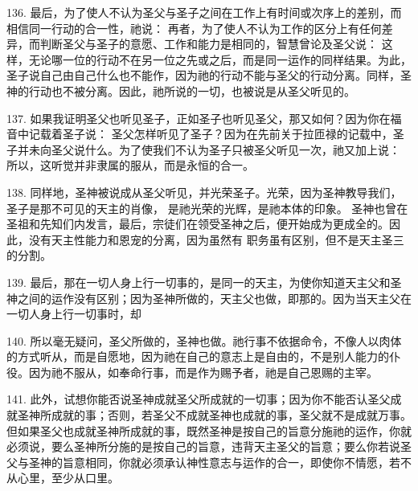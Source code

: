 136. 最后，为了使人不认为圣父与圣子之间在工作上有时间或次序上的差别，而相信同一行动的合一性，祂说： 再者，为了使人不认为工作的区分上有任何差异，而判断圣父与圣子的意愿、工作和能力是相同的，智慧曾论及圣父说： 这样，无论哪一位的行动不在另一位之先或之后，而是同一运作的同样结果。为此，圣子说自己由自己什么也不能作，因为祂的行动不能与圣父的行动分离。同样，圣神的行动也不被分离。因此，祂所说的一切，也被说是从圣父听见的。\par

137. 如果我证明圣父也听见圣子，正如圣子也听见圣父，那又如何？因为你在福音中记载着圣子说： 圣父怎样听见了圣子？因为在先前关于拉匝禄的记载中，圣子并未向圣父说什么。为了使我们不认为圣子只被圣父听见一次，祂又加上说： 所以，这听觉并非隶属的服从，而是永恒的合一。\par

138. 同样地，圣神被说成从圣父听见，并光荣圣子。光荣，因为圣神教导我们，圣子是那不可见的天主的肖像， 是祂光荣的光辉，是祂本体的印象。 圣神也曾在圣祖和先知们内发言，最后，宗徒们在领受圣神之后，便开始成为更成全的。因此，没有天主性能力和恩宠的分离，因为虽然有 职务虽有区别，但不是天主圣三的分割。\par

139. 最后，那在一切人身上行一切事的，是同一的天主，为使你知道天主父和圣神之间的运作没有区别；因为圣神所做的，天主父也做，即那的。因为当天主父在一切人身上行一切事时，却\par

140. 所以毫无疑问，圣父所做的，圣神也做。祂行事不依据命令，不像人以肉体的方式听从，而是自愿地，因为祂在自己的意志上是自由的，不是别人能力的仆役。因为祂不服从，如奉命行事，而是作为赐予者，祂是自己恩赐的主宰。\par

141. 此外，试想你能否说圣神成就圣父所成就的一切事；因为你不能否认圣父成就圣神所成就的事；否则，若圣父不成就圣神也成就的事，圣父就不是成就万事。但如果圣父也成就圣神所成就的事，既然圣神是按自己的旨意分施祂的运作，你就必须说，要么圣神所分施的是按自己的旨意，违背天主圣父的旨意；要么你若说圣父与圣神的旨意相同，你就必须承认神性意志与运作的合一，即使你不情愿，若不从心里，至少从口里。\par

